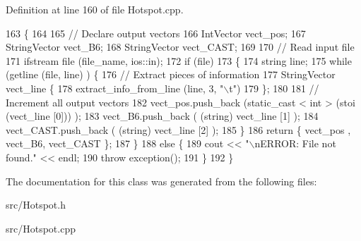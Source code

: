 Definition at line 160 of file Hotspot.\+cpp.


\begin{DoxyCode}
163 \{
164     
165     \textcolor{comment}{// Declare output vectors}
166     IntVector vect\_pos;
167     StringVector vect\_B6;
168     StringVector vect\_CAST;
169     
170     \textcolor{comment}{// Read input file}
171     ifstream file (file\_name, ios::in);
172     \textcolor{keywordflow}{if} (file)
173     \{
174         \textcolor{keywordtype}{string} line;
175         \textcolor{keywordflow}{while} (getline (file, line) ) \{
176             \textcolor{comment}{// Extract pieces of information}
177             StringVector vect\_line \{ 
178                 extract\_info\_from\_line (line, 3, \textcolor{stringliteral}{"\(\backslash\)t"}) 
179             \};
180             
181             \textcolor{comment}{// Increment all output vectors}
182             vect\_pos.push\_back (static\_cast < int > (stoi (vect\_line [0])) );
183             vect\_B6.push\_back ( (\textcolor{keywordtype}{string}) vect\_line [1] );
184             vect\_CAST.push\_back ( (\textcolor{keywordtype}{string}) vect\_line [2] );
185         \}
186         \textcolor{keywordflow}{return} \{ vect\_pos , vect\_B6, vect\_CAST \};
187     \}
188     \textcolor{keywordflow}{else} \{
189         cout << \textcolor{stringliteral}{"\(\backslash\)nERROR: File not found."} << endl;
190         \textcolor{keywordflow}{throw} exception();
191     \}
192 \}
\end{DoxyCode}


The documentation for this class was generated from the following files\+:\begin{DoxyCompactItemize}
\item 
src/Hotspot.\+h\item 
src/Hotspot.\+cpp\end{DoxyCompactItemize}
